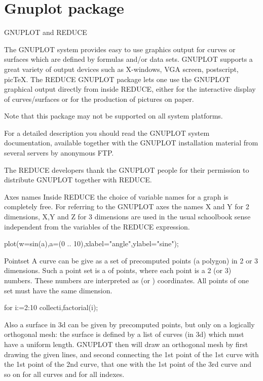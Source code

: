 \newpage
\section{Gnuplot package}

\begin{Introduction}{GNUPLOT and REDUCE}

The GNUPLOT system provides easy to use graphics output
for curves or surfaces which are defined by
formulas and/or data sets. GNUPLOT supports
a great variety of output devices
such as X-windows, VGA screen, postscript, picTeX.
The REDUCE GNUPLOT package lets one use the GNUPLOT
graphical output directly from inside REDUCE, either for
the interactive display of curves/surfaces or for the production
of pictures on paper.

Note that this package may not be supported on all system
platforms.

For a detailed description you should read the GNUPLOT
system documentation, available together with the GNUPLOT
installation material from several servers by anonymous FTP.

The REDUCE developers thank the GNUPLOT people for their permission
to distribute GNUPLOT together with REDUCE.
\end{Introduction}

\begin{Concept}{Axes names}
Inside REDUCE the choice of variable names for a graph is completely
free. For referring to the GNUPLOT axes the names
X and Y for 2 dimensions, X,Y and Z for 3 dimensions are used
in the usual schoolbook sense independent from the variables of
the REDUCE expression.

\begin{Examples}
  plot(w=sin(a),a=(0 .. 10),xlabel="angle",ylabel="sine");
\end{Examples}

\end{Concept}

\begin{Type}{Pointset}
A curve can be give as a set of precomputed points (a polygon)
in 2 or 3 dimensions. Such a point set is a 
of points, where each point is a  2 (or 3)
numbers. These numbers are interpreted as 
(or ) coordinates. All points of one set must have
the same dimension.

\begin{Examples}
 for i:=2:10 collect{i,factorial(i)};

\end{Examples}

Also a surface in 3d can be given by precomputed points,
but only on a logically orthogonal mesh: the surface is defined
by a list of curves (in 3d) which must have a uniform length.
GNUPLOT then will draw an orthogonal mesh by first drawing the
given lines, and second connecting the 1st point of the 1st curve
with the 1st point of the 2nd curve, that one with the 1st point
of the 3rd curve and so on for all curves and for all indexes.


\end{Type}


